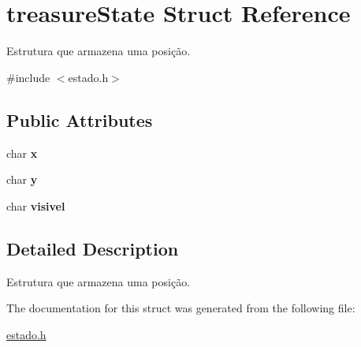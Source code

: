 \hypertarget{structtreasureState}{}\section{treasure\+State Struct Reference}
\label{structtreasureState}


Estrutura que armazena uma posição.  




{\ttfamily \#include $<$estado.\+h$>$}

\subsection*{Public Attributes}
\begin{DoxyCompactItemize}
\item 
char {\bfseries x}\hypertarget{structtreasureState_acd91a86f6567d2ffac7b2a8c35ecfe28}{}\label{structtreasureState_acd91a86f6567d2ffac7b2a8c35ecfe28}

\item 
char {\bfseries y}\hypertarget{structtreasureState_a60c45acc4f6ed888fbf5d75324d8789f}{}\label{structtreasureState_a60c45acc4f6ed888fbf5d75324d8789f}

\item 
char {\bfseries visivel}\hypertarget{structtreasureState_a4a72a22f2d740642fc016d7bb4bb3c0b}{}\label{structtreasureState_a4a72a22f2d740642fc016d7bb4bb3c0b}

\end{DoxyCompactItemize}


\subsection{Detailed Description}
Estrutura que armazena uma posição. 

The documentation for this struct was generated from the following file\+:\begin{DoxyCompactItemize}
\item 
\hyperlink{estado_8h}{estado.\+h}\end{DoxyCompactItemize}
